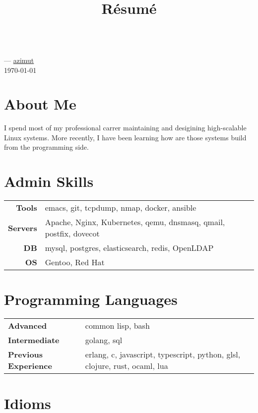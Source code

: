 \documentclass[11pt]{article}
\renewcommand{\maketitle}{
  \begin{center}{\huge\bfseries\theauthor} \\
    \vspace{.25em}
    {\faEnvelope} \href {mailto:\MAILTO} {\expandafter\randomize\expandafter{\MAILTO}}
    ---
    {\faGithub} \href {https://github.com/azimut} {azimut} \\
    \vspace{.25em}
    \today
  \end{center}
}
\begin{document}
\title{R\'esum\'e}
\author{\FULLNAME}

\maketitle


\section{About Me}

I spend most of my professional carrer maintaining and desigining high-scalable Linux systems. More recently, I have been learning how are those systems build from the programming side.


\section{Admin Skills}


\begin{tabular}{@{}rll@{}}
  \hspace{.1em} \textbf{Tools}   & emacs, git, tcpdump, nmap, docker, ansible \\
  \hspace{.1em} \textbf{Servers} & Apache, Nginx, Kubernetes, qemu, dnsmasq, qmail, postfix, dovecot \\
  \hspace{.1em} \textbf{DB}      & mysql, postgres, elasticsearch, redis, OpenLDAP \\
  \hspace{.1em} \textbf{OS}      & Gentoo, Red Hat
\end{tabular}


\section{Programming Languages}


\begin{tabular}{@{}lll@{}}
  \hspace{.1em} \textbf{Advanced} & common lisp, bash \\
  \hspace{.1em} \textbf{Intermediate} & golang, sql \\
  \hspace{.1em} \textbf{Previous Experience} & erlang, c, javascript, typescript, python, glsl, clojure, rust, ocaml, lua
\end{tabular}


\section{Idioms}
\end{document}
